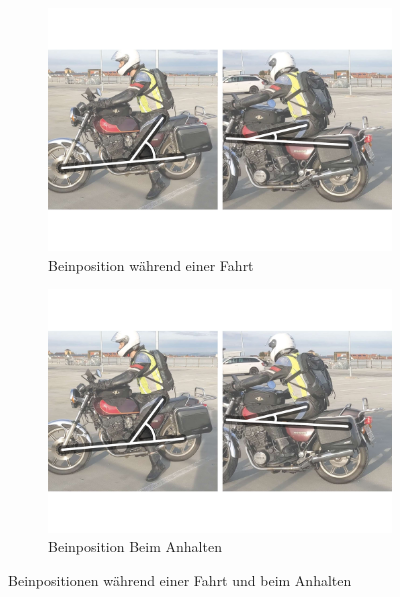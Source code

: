 \begin{figure}[htpb]
	\centering
	\begin{subfigure}{0.48\textwidth}
		\centering
		\includegraphics[width=\textwidth]{Bilder/0_Beinposition_Anhalten_Fahren.pdf}
		\caption{Beinposition während einer Fahrt}
		\label{fig:MotorbikeDriving}
	\end{subfigure}
	\hfill
	\begin{subfigure}{0.48\textwidth}
		\centering
		\includegraphics[width=\textwidth]{Bilder/0_Beinposition_Anhalten_Stehen.pdf}
		\caption{Beinposition Beim Anhalten}
		\label{fig:MotorbikeStanding2}
	\end{subfigure}
	\caption{Beinpositionen während einer Fahrt und beim Anhalten}
	\label{fig:MotorbikeDrivingStanding}
\end{figure}


 